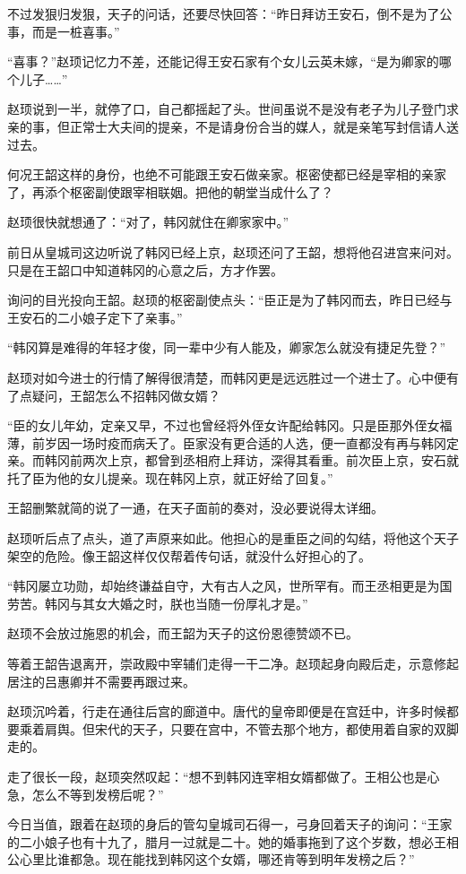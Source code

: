 不过发狠归发狠，天子的问话，还要尽快回答：“昨日拜访王安石，倒不是为了公事，而是一桩喜事。”

“喜事？”赵顼记忆力不差，还能记得王安石家有个女儿云英未嫁，“是为卿家的哪个儿子……”

赵顼说到一半，就停了口，自己都摇起了头。世间虽说不是没有老子为儿子登门求亲的事，但正常士大夫间的提亲，不是请身份合当的媒人，就是亲笔写封信请人送过去。

何况王韶这样的身份，也绝不可能跟王安石做亲家。枢密使都已经是宰相的亲家了，再添个枢密副使跟宰相联姻。把他的朝堂当成什么了？

赵顼很快就想通了：“对了，韩冈就住在卿家家中。”

前日从皇城司这边听说了韩冈已经上京，赵顼还问了王韶，想将他召进宫来问对。只是在王韶口中知道韩冈的心意之后，方才作罢。

询问的目光投向王韶。赵顼的枢密副使点头：“臣正是为了韩冈而去，昨日已经与王安石的二小娘子定下了亲事。”

“韩冈算是难得的年轻才俊，同一辈中少有人能及，卿家怎么就没有捷足先登？”

赵顼对如今进士的行情了解得很清楚，而韩冈更是远远胜过一个进士了。心中便有了点疑问，王韶怎么不招韩冈做女婿？

“臣的女儿年幼，定亲又早，不过也曾经将外侄女许配给韩冈。只是臣那外侄女福薄，前岁因一场时疫而病夭了。臣家没有更合适的人选，便一直都没有再与韩冈定亲。而韩冈前两次上京，都曾到丞相府上拜访，深得其看重。前次臣上京，安石就托了臣为他的女儿提亲。现在韩冈上京，就正好给了回复。”

王韶删繁就简的说了一通，在天子面前的奏对，没必要说得太详细。

赵顼听后点了点头，道了声原来如此。他担心的是重臣之间的勾结，将他这个天子架空的危险。像王韶这样仅仅帮着传句话，就没什么好担心的了。

“韩冈屡立功勋，却始终谦益自守，大有古人之风，世所罕有。而王丞相更是为国劳苦。韩冈与其女大婚之时，朕也当随一份厚礼才是。”

赵顼不会放过施恩的机会，而王韶为天子的这份恩德赞颂不已。

等着王韶告退离开，崇政殿中宰辅们走得一干二净。赵顼起身向殿后走，示意修起居注的吕惠卿并不需要再跟过来。

赵顼沉吟着，行走在通往后宫的廊道中。唐代的皇帝即便是在宫廷中，许多时候都要乘着肩舆。但宋代的天子，只要在宫中，不管去那个地方，都使用着自家的双脚走的。

走了很长一段，赵顼突然叹起：“想不到韩冈连宰相女婿都做了。王相公也是心急，怎么不等到发榜后呢？”

今日当值，跟着在赵顼的身后的管勾皇城司石得一，弓身回着天子的询问：“王家的二小娘子也有十九了，腊月一过就是二十。她的婚事拖到了这个岁数，想必王相公心里比谁都急。现在能找到韩冈这个女婿，哪还肯等到明年发榜之后？”


